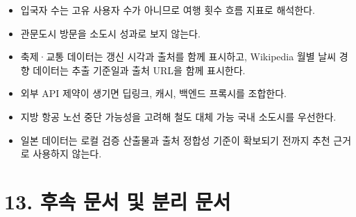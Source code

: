 \documentclass[12pt,a4paper]{article}
\newcommand{\DocNeedspace}[1]{\par\ifdim\dimexpr\pagegoal-\pagetotal\relax<#1\newpage\fi}
\newcommand{\TocNoChildTight}{\vspace{-0.28em}}
\begin{document}
\begin{itemize}
\item 입국자 수는 고유 사용자 수가 아니므로 여행 횟수 흐름 지표로 해석한다.
\item 관문도시 방문을 소도시 성과로 보지 않는다.
\item 축제·교통 데이터는 갱신 시각과 출처를 함께 표시하고, Wikipedia 월별 날씨 경향 데이터는 추출 기준일과 출처 URL을 함께 표시한다.
\item 외부 API 제약이 생기면 딥링크, 캐시, 백엔드 프록시를 조합한다.
\item 지방 항공 노선 중단 가능성을 고려해 철도 대체 가능 국내 소도시를 우선한다.
\item 일본 데이터는 로컬 검증 산출물과 출처 정합성 기준이 확보되기 전까지 추천 근거로 사용하지 않는다.
\end{itemize}


\newpage

\DocNeedspace{10\baselineskip}
\section*{13. 후속 문서 및 분리 문서}
\addtocontents{toc}{\protect\TocNoChildTight}
\end{document}
